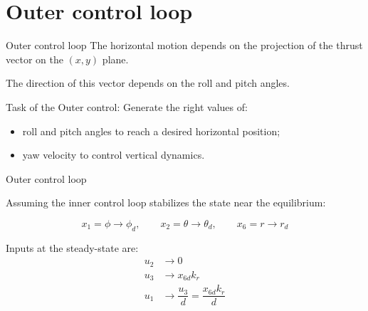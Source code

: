 \section*{Outer control loop}

\begin{frame}{Outer control loop}
	The horizontal motion depends on the projection of the thrust vector on the $ (x,y) $ plane.
	
	The direction of this vector depends on the roll and pitch angles.
	\bigskip
	\begin{alertblock}{Task of the Outer control: \bigskip}
		Generate the right values of:
		\begin{itemize}
			\item roll and pitch angles to reach a desired horizontal position;
			\item yaw velocity to control vertical dynamics.
		\end{itemize} 
	\end{alertblock}
\end{frame}

\begin{frame}{Outer control loop}
	
	Assuming the inner control loop stabilizes the state near the equilibrium:
	
	\begin{equation}
	x_1=\phi \rightarrow \phi_d, \qquad x_2=\theta \rightarrow \theta_d, \qquad x_6=r \rightarrow r_d
	\end{equation}
	\bigskip
	
	\begin{block}{Inputs at the steady-state are: }
		\begin{align*}
			u_2& \rightarrow 0 \\
			u_3& \rightarrow x_{6d} k_r \\
			u_1& \rightarrow \dfrac{u_3}{d}= \dfrac{x_{6d} k_r}{d}
		\end{align*}
	\end{block}

\end{frame}

